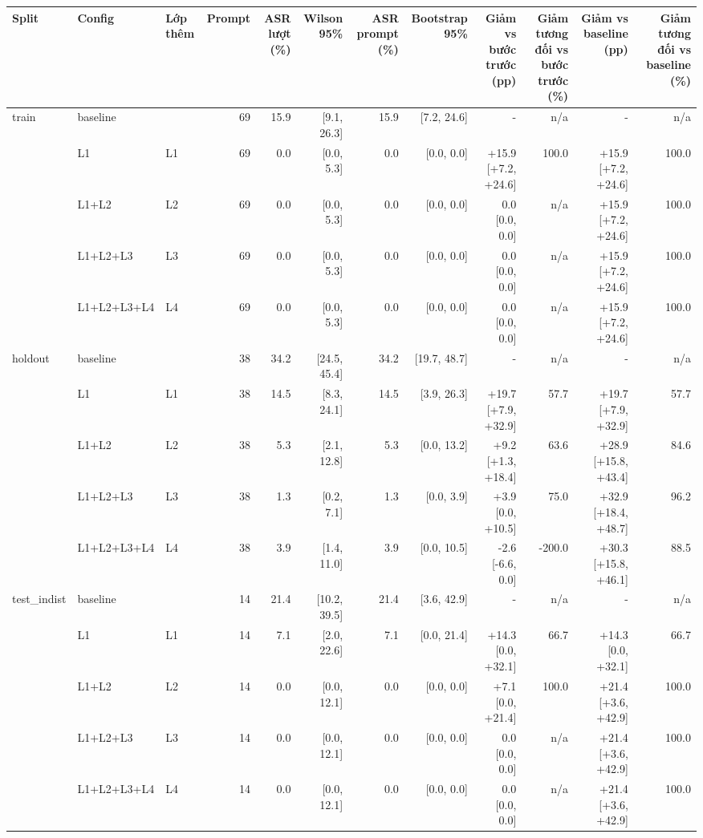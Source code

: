 \begin{tabular}{lllrrrrrrrrr}
\toprule
Split & Config & Lớp thêm & Prompt & ASR lượt (\%) & Wilson 95\% & ASR prompt (\%) & Bootstrap 95\% & Giảm vs bước trước (pp) & Giảm tương đối vs bước trước (\%) & Giảm vs baseline (pp) & Giảm tương đối vs baseline (\%) \\
\midrule
train & baseline &  & 69 & 15.9 & [9.1, 26.3] & 15.9 & [7.2, 24.6] & - & n/a & - & n/a \\
 & L1 & L1 & 69 & 0.0 & [0.0, 5.3] & 0.0 & [0.0, 0.0] & +15.9 [+7.2, +24.6] & 100.0 & +15.9 [+7.2, +24.6] & 100.0 \\
 & L1+L2 & L2 & 69 & 0.0 & [0.0, 5.3] & 0.0 & [0.0, 0.0] & 0.0 [0.0, 0.0] & n/a & +15.9 [+7.2, +24.6] & 100.0 \\
 & L1+L2+L3 & L3 & 69 & 0.0 & [0.0, 5.3] & 0.0 & [0.0, 0.0] & 0.0 [0.0, 0.0] & n/a & +15.9 [+7.2, +24.6] & 100.0 \\
 & L1+L2+L3+L4 & L4 & 69 & 0.0 & [0.0, 5.3] & 0.0 & [0.0, 0.0] & 0.0 [0.0, 0.0] & n/a & +15.9 [+7.2, +24.6] & 100.0 \\
\midrule
holdout & baseline &  & 38 & 34.2 & [24.5, 45.4] & 34.2 & [19.7, 48.7] & - & n/a & - & n/a \\
 & L1 & L1 & 38 & 14.5 & [8.3, 24.1] & 14.5 & [3.9, 26.3] & +19.7 [+7.9, +32.9] & 57.7 & +19.7 [+7.9, +32.9] & 57.7 \\
 & L1+L2 & L2 & 38 & 5.3 & [2.1, 12.8] & 5.3 & [0.0, 13.2] & +9.2 [+1.3, +18.4] & 63.6 & +28.9 [+15.8, +43.4] & 84.6 \\
 & L1+L2+L3 & L3 & 38 & 1.3 & [0.2, 7.1] & 1.3 & [0.0, 3.9] & +3.9 [0.0, +10.5] & 75.0 & +32.9 [+18.4, +48.7] & 96.2 \\
 & L1+L2+L3+L4 & L4 & 38 & 3.9 & [1.4, 11.0] & 3.9 & [0.0, 10.5] & -2.6 [-6.6, 0.0] & -200.0 & +30.3 [+15.8, +46.1] & 88.5 \\
\midrule
test\_indist & baseline &  & 14 & 21.4 & [10.2, 39.5] & 21.4 & [3.6, 42.9] & - & n/a & - & n/a \\
 & L1 & L1 & 14 & 7.1 & [2.0, 22.6] & 7.1 & [0.0, 21.4] & +14.3 [0.0, +32.1] & 66.7 & +14.3 [0.0, +32.1] & 66.7 \\
 & L1+L2 & L2 & 14 & 0.0 & [0.0, 12.1] & 0.0 & [0.0, 0.0] & +7.1 [0.0, +21.4] & 100.0 & +21.4 [+3.6, +42.9] & 100.0 \\
 & L1+L2+L3 & L3 & 14 & 0.0 & [0.0, 12.1] & 0.0 & [0.0, 0.0] & 0.0 [0.0, 0.0] & n/a & +21.4 [+3.6, +42.9] & 100.0 \\
 & L1+L2+L3+L4 & L4 & 14 & 0.0 & [0.0, 12.1] & 0.0 & [0.0, 0.0] & 0.0 [0.0, 0.0] & n/a & +21.4 [+3.6, +42.9] & 100.0 \\
\bottomrule
\end{tabular}
